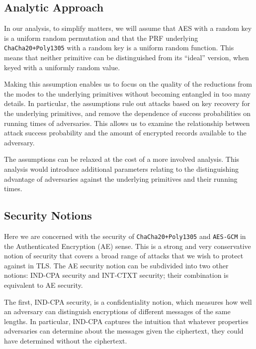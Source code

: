 \documentclass{article}
\begin{document}
\subsection{Analytic Approach}
In our analysis, to simplify matters, we will assume that AES with a random key is a uniform random permutation and that the PRF underlying \texttt{ChaCha20+Poly1305} with a random key is a uniform random function. This means that neither primitive can be distinguished from its ``ideal'' version, when keyed with a uniformly random value. %

Making this assumption enables us to focus on the quality of the reductions from the modes to the underlying primitives without becoming entangled in too many details. In particular, the assumptions rule out attacks based on key recovery for the underlying primitives, and remove the dependence of success probabilities on running times of adversaries. This allows us to examine the relationship between attack success probability and the amount of encrypted records available to the adversary.

The assumptions can be relaxed at the cost of a more involved analysis. This analysis would introduce additional parameters relating to the distinguishing advantage of adversaries against the underlying primitives and their running times. 

\subsection{Security Notions}

Here we are concerned with the security of \texttt{ChaCha20+Poly1305} and  \texttt{AES-GCM} in the Authenticated Encryption (AE) sense. This is a strong and very conservative notion of security that covers a broad range of attacks that we wish to protect against in TLS. The AE security notion can be subdivided into two other notions: IND-CPA security and INT-CTXT security; their combination is equivalent to AE security. 

The first, IND-CPA security, is a confidentiality notion, which measures how well an adversary can distinguish encryptions of different messages of the same lengths. In particular, IND-CPA captures the intuition that whatever properties adversaries can determine about the messages given the ciphertext, they could have determined without the ciphertext.
\end{document}
